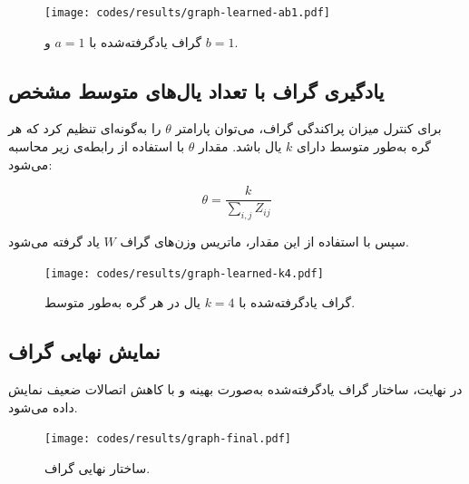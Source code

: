 \documentclass[12pt,onecolumn,a4paper]{article}
\begin{document}
	\begin{latin}
		
	\end{latin}
	
	\begin{figure}[H]
		\centering
		\texttt{[image: codes/results/graph-learned-ab1.pdf]}
		\caption{گراف یادگرفته‌شده با \( a = 1 \) و \( b = 1 \).}
		\label{fig:graph-learned-ab1}
	\end{figure}
	
	\subsection{یادگیری گراف با تعداد یال‌های متوسط مشخص}
	برای کنترل میزان پراکندگی گراف، می‌توان پارامتر \( \theta \) را به‌گونه‌ای تنظیم کرد که هر گره به‌طور متوسط دارای \( k \) یال باشد. مقدار \( \theta \) با استفاده از رابطه‌ی زیر محاسبه می‌شود:
	
	\[
	\theta = \frac{k}{\sum_{i,j} Z_{ij}}
	\]
	
	سپس با استفاده از این مقدار، ماتریس وزن‌های گراف \( W \) یاد گرفته می‌شود.
	
	\begin{latin}
		
	\end{latin}
	
	
	\begin{figure}[H]
		\centering
		\texttt{[image: codes/results/graph-learned-k4.pdf]}
		\caption{گراف یادگرفته‌شده با \( k = 4 \) یال در هر گره به‌طور متوسط.}
		\label{fig:graph-learned-k4}
	\end{figure}
	
	\subsection{نمایش نهایی گراف}
	در نهایت، ساختار گراف یادگرفته‌شده به‌صورت بهینه و با کاهش اتصالات ضعیف نمایش داده می‌شود.
	
	\begin{latin}
		
	\end{latin}
	
	
	\begin{figure}[H]
		\centering
		\texttt{[image: codes/results/graph-final.pdf]}
		\caption{ساختار نهایی گراف.}
		\label{fig:graph-final}
	\end{figure}
	
    	

    
    
    
	\nocite{*}
\end{document}
